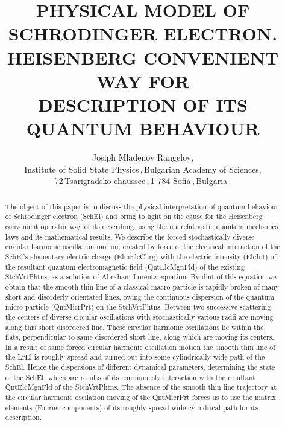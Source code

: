 \documentclass[12pt]{article}
\begin{document}
\title{\large\bfseries PHYSICAL MODEL OF SCHRODINGER ELECTRON.\\
                          HEISENBERG CONVENIENT WAY FOR       \\
                       DESCRIPTION OF ITS QUANTUM BEHAVIOUR }
\vspace{-3cm}

\author{\sffamily Josiph Mladenov Rangelov,\\
Institute of Solid State Physics\,,\,Bulgarian Academy of Sciences,\\
72\,Tsarigradsko chaussee\,,\,1 784 Sofia\,,\,Bulgaria\,.}
\date{}
\maketitle
\vspace{-1cm}

\begin{abstract}
 The object of this paper is to discuss the physical interpretation of
quantum behaviour of Schrodinger electron (SchEl) and bring to light on
the cause for the Heisenberg convenient operator way of its describing,
using the nonrelativistic quantum mechanics laws and its mathematical
results. We describe the forced stochastically diverse circular harmonic
oscillation motion, created by force of the electrical interaction of the
SchEl's elementary electric charge (ElmElcChrg) with the electric intensity
(ElcInt) of the resultant quantum electromagnetic field (QntElcMgnFld)
of the existing StchVrtPhtns, as a solution of Abraham-Lorentz equation.
By dint of this equation we obtain that the smooth thin line of a classical
macro particle is rapidly broken of many short and disorderly orientated
lines, owing the continuous dispersion of the quantum micro particle
(QntMicrPrt) on the StchVrtPhtns. Between two successive scattering the
centers of diverse circular oscillations with stochastically various radii
are moving along this short disordered line. These circular harmonic
oscillations lie within the flats, perpendicular to same disordered short
line, along which are moving its centers. In a result of same forced
circular harmonic oscillation motion the smooth thin line of the LrEl is
roughly spread and turned out into some cylindrically wide path of the SchEl.
Hence the dispersions of different dynamical parameters, determining the
state of the SchEl, which are results of its continuously interaction with
the resultant QntElcMgnFld of the StchVrtPhtns. The absence of the smooth
thin line trajectory at the circular harmonic oscilation moving of the
QntMicrPrt forces us to use the matrix elements (Fourier components) of its
roughly spread wide cylindrical path for its description.
\end{abstract}
\end{document}
